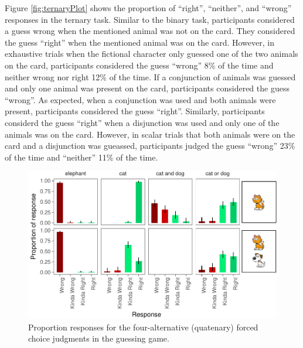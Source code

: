 \documentclass[floatsintext,man]{apa6}
\theoremstyle{definition}
\theoremstyle{definition}
\theoremstyle{definition}
\theoremstyle{remark}
\begin{document}
Figure \ref{fig:ternaryPlot} shows the proportion of \enquote{right},
\enquote{neither}, and \enquote{wrong} responses in the ternary task.
Similar to the binary task, participants considered a guess wrong when
the mentioned animal was not on the card. They considered the guess
\enquote{right} when the mentioned animal was on the card. However, in
exhaustive trials when the fictional character only guessed one of the
two animals on the card, participants considered the guess
\enquote{wrong} 8\% of the time and neither wrong nor right 12\% of the
time. If a conjunction of animals was guessed and only one animal was
present on the card, participants considered the guess \enquote{wrong}.
As expected, when a conjunction was used and both animals were present,
participants considered the guess \enquote{right}. Similarly,
participants considerd the guess \enquote{right} when a disjunction was
used and only one of the animals was on the card. However, in scalar
trials that both animals were on the card and a disjunction was
gueassed, participants judged the guess \enquote{wrong} 23\% of the time
and \enquote{neither} 11\% of the time.

\begin{figure}
\centering
\includegraphics{writeup_files/figure-latex/quaternaryPlot-1.pdf}
\caption{\label{fig:quaternaryPlot}Proportion responses for the
four-alternative (quatenary) forced choice judgments in the guessing
game.}
\end{figure}
\end{document}
